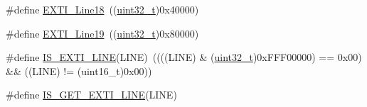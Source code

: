 \begin{DoxyCompactItemize}
$$\item 
\#define \hyperlink{group___e_x_t_i___lines_ga6cdf346a3e7a3c8dbb036aca6741207c}{E\+X\+T\+I\+\_\+\+Line18}~((\hyperlink{_p_e___types_8h_a33594304e786b158f3fb30289278f5af}{uint32\+\_\+t})0x40000)
\item 
\#define \hyperlink{group___e_x_t_i___lines_ga49ac0744621f88d432d85838483ad1de}{E\+X\+T\+I\+\_\+\+Line19}~((\hyperlink{_p_e___types_8h_a33594304e786b158f3fb30289278f5af}{uint32\+\_\+t})0x80000)
\item 
\#define \hyperlink{group___e_x_t_i___lines_gaade8b8717a1d78f83d3cf180e2817557}{I\+S\+\_\+\+E\+X\+T\+I\+\_\+\+L\+I\+NE}(L\+I\+NE)~((((L\+I\+NE) \& (\hyperlink{_p_e___types_8h_a33594304e786b158f3fb30289278f5af}{uint32\+\_\+t})0x\+F\+F\+F00000) == 0x00) \&\& ((\+L\+I\+N\+E) != (uint16\+\_\+t)0x00))
\item 
\#define \hyperlink{group___e_x_t_i___lines_ga77c85c7b8426c6cfe91b4f5a2c58ecda}{I\+S\+\_\+\+G\+E\+T\+\_\+\+E\+X\+T\+I\+\_\+\+L\+I\+NE}(L\+I\+NE)
\end{DoxyCompactItemize}
